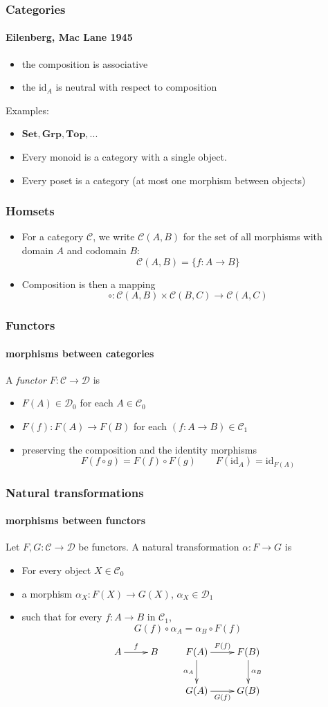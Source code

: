 \documentclass{beamer}
\newcommand{\id}{\mathrm{id}}
\newcommand{\C}{\mathcal{C}}
\newcommand{\D}{\mathcal{D}}
\newcommand{\Set}{\mathbf{Set}}
\newcommand{\Top}{\mathbf{Top}}
\newcommand{\Grp}{\mathbf{Grp}}
\begin{document}
\begin{frame}
\frametitle{Categories}
\framesubtitle{Eilenberg, Mac Lane 1945}
\begin{definition}
\begin{itemize}
\item the composition is associative
\item the $\id_A$ is neutral with respect to composition
\end{itemize}
\end{definition}
Examples: 
\begin{itemize}
\item $\Set,\Grp,\Top,...$
\item Every monoid is a category with a single object.
\item Every poset is a category (at most one morphism between objects)
\end{itemize}
\end{frame}
\begin{frame}
\frametitle{Homsets}
\begin{itemize}
\item For a category $\C$, we write $\C(A,B)$ for the set of all morphisms
with domain $A$ and codomain $B$:
\[
\C(A,B)=\{f\colon A\to B\}
\]
\item Composition is then a mapping
\[
\circ\colon \C(A,B)\times\C(B,C)\to\C(A,C)
\]
\end{itemize}
\end{frame}
\begin{frame}
\frametitle{Functors}
\framesubtitle{morphisms between categories}
A \emph{functor} $F\colon \C\to\D$ is
\begin{itemize}
\item $F(A)\in\D_0$ for each $A\in\C_0$
\item $F(f)\colon F(A)\to F(B)$ for each $(f\colon A\to B)\in\C_1$
\item preserving the composition and the identity morphisms
\[
F(f\circ g)=F(f)\circ F(g)\qquad F(\id_A)=\id_{F(A)}
\]
\end{itemize}
\end{frame}
\begin{frame}
\frametitle{Natural transformations}
\framesubtitle{morphisms between functors}
Let $F,G\colon \C\to\D$ be functors.
A natural transformation $\alpha\colon F\to G$ is
\begin{itemize}
\item For every object $X\in\C_0$
\item a morphism $\alpha_X\colon F(X)\to G(X)$, $\alpha_X\in\D_1$
\item such that for every $f\colon A\to B$ in $\C_1$,
\[
G(f)\circ\alpha_A=\alpha_B\circ F(f)
\]
\[
\xymatrix{
A\ar[r]^f&B
}
\qquad
\xymatrix{
F(A)
    \ar[r]^{F(f)}
    \ar[d]_{\alpha_A}
&
F(B)
    \ar[d]^{\alpha_B}
\\
G(A)
    \ar[r]_{G(f)}
&
G(B)
}
\]
\end{itemize}
\end{frame}
\end{document}
